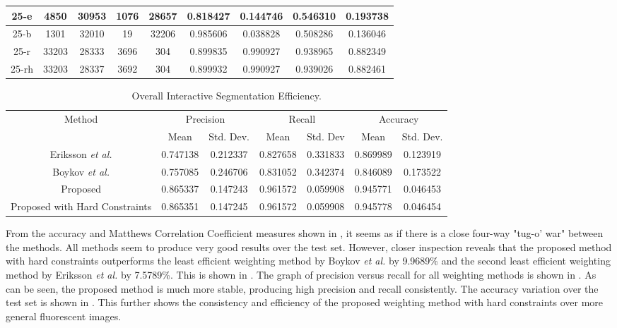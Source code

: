 \begin{longtable}[!h]{|c|c|c|c|c|c|c|c|c|}
	\hline	25-e	&	4850	&	30953	&	1076	&	28657	&	0.818427	&	0.144746	&	0.546310	&	0.193738	\\
	\hline \rowcolor{bad}	25-b	&	1301	&	32010	&	19	&	32206	&	0.985606	&	0.038828	&	0.508286	&	0.136046	\\
	\hline	25-r	&	33203	&	28333	&	3696	&	304	&	0.899835	&	0.990927	&	0.938965	&	0.882349	\\
	\hline \rowcolor{closest}	25-rh	&	33203	&	28337	&	3692	&	304	&	0.899932	&	0.990927	&	0.939026	&	0.882461	\\
	\hline 
\end{longtable} 

\begin{longtable}[!h]{|c|c|c|c|c|c|c|}
	\caption{Overall Interactive Segmentation Efficiency.} \label{tab:overallinteractivesegmentationefficiency}\\
	\hline 
	\multirow{2}{*}{Method} & \multicolumn{2}{c|}{Precision} & \multicolumn{2}{c|}{Recall} & \multicolumn{2}{c|}{Accuracy} \\ 
	\hhline{~------}
	& Mean & Std. Dev. & Mean & Std. Dev & Mean & Std. Dev.  \\ 
	\hline	Eriksson \textit{et al.} \citep{Eriksson2006}	&	0.747138	&	0.212337	&	0.827658	&	0.331833	&	0.869989	&	0.123919	\\
	\hline \rowcolor{bad}	Boykov \textit{et al.} \citep{Boykov2001_2}	&	0.757085	&	0.246706	&	0.831052	&	0.342374	&	0.846089	&	0.173522	\\
	\hline	Proposed	&	0.865337	&	0.147243	&	0.961572	&	0.059908	&	0.945771	&	0.046453	\\
	\hline \rowcolor{closest}	Proposed with Hard Constraints	&	0.865351	&	0.147245	&	0.961572	&	0.059908	&	0.945778	&	0.046454	\\	
	\hline
\end{longtable}

From the accuracy and Matthews Correlation Coefficient measures shown in , it seems as if there is a close four-way "tug-o' war" between the methods. All methods seem to produce very good results over the test set. However, closer inspection reveals that the proposed method with hard constraints outperforms the least efficient weighting method by Boykov \textit{et al.} \citep{Boykov2001_2} by 9.9689\% and the second least efficient weighting method by Eriksson \textit{et al.} \citep{Eriksson2006} by 7.5789\%. This is shown in . The graph of precision versus recall for all weighting methods is shown in . As can be seen, the proposed method is much more stable, producing high precision and recall consistently. The accuracy variation over the test set is shown in . This further shows the consistency and efficiency of the proposed weighting method with hard constraints over more general fluorescent images.

